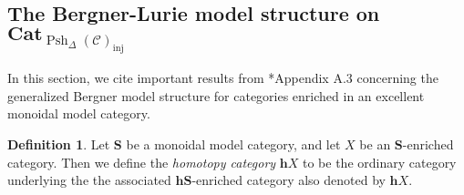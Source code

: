 \documentclass[a4paper]{article}
\numberwithin{equation}{subsection}
\theoremstyle{plain}   %
\theoremstyle{definition}
\newtheorem{defn}[equation]{Definition}
\theoremstyle{remark}
\theoremstyle{plain}
\newcommand{\Cat}{\ensuremath{\mathbf{Cat}}}
\newcommand{\spsh}{\ensuremath{\operatorname{Psh}_\Delta(\mathcal{C})}}
\begin{document}
\subsection{The Bergner-Lurie model structure on \(\Cat_{\spsh_{\mathrm{inj}}}\)}
In this section, we cite important results from \cite{htt}*{Appendix A.3} concerning the generalized Bergner model structure for categories enriched in an excellent monoidal model category.  

\begin{defn}
	Let \(\mathbf{S}\) be a monoidal model category, and let \(X\) be an \(\mathbf{S}\)-enriched category.  Then we define the \emph{homotopy category} \(\mathbf{h}X\) to be the ordinary category underlying the the associated \(\mathbf{h}\mathbf{S}\)-enriched category also denoted by \(\mathbf{h}X\).  
\end{defn}
\end{document}
